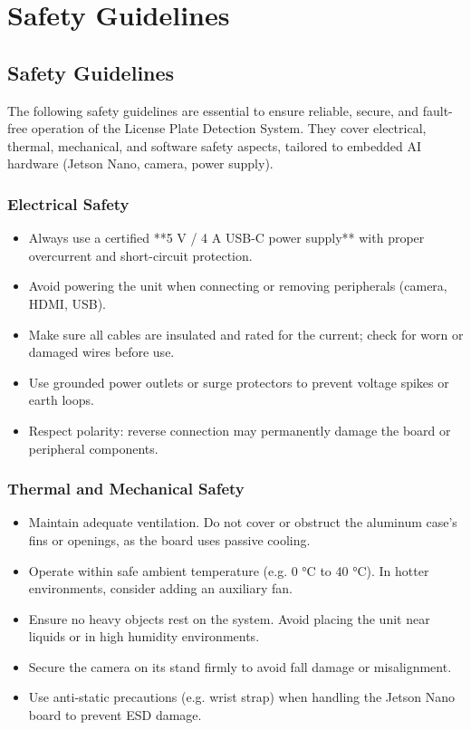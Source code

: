 %
%

\chapter{Safety Guidelines}

\section{Safety Guidelines}

The following safety guidelines are essential to ensure reliable, secure, and fault-free operation of the License Plate Detection System.  
They cover electrical, thermal, mechanical, and software safety aspects, tailored to embedded AI hardware (Jetson Nano, camera, power supply).

\subsection{Electrical Safety}

\begin{itemize}
	\item Always use a certified **5 V / 4 A USB-C power supply** with proper overcurrent and short-circuit protection.  
	\item Avoid powering the unit when connecting or removing peripherals (camera, HDMI, USB).  
	\item Make sure all cables are insulated and rated for the current; check for worn or damaged wires before use.  
	\item Use grounded power outlets or surge protectors to prevent voltage spikes or earth loops.  
	\item Respect polarity: reverse connection may permanently damage the board or peripheral components.
\end{itemize}

\subsection{Thermal and Mechanical Safety}

\begin{itemize}
	\item Maintain adequate ventilation. Do not cover or obstruct the aluminum case’s fins or openings, as the board uses passive cooling.  
	\item Operate within safe ambient temperature (e.g. 0 °C to 40 °C). In hotter environments, consider adding an auxiliary fan.  
	\item Ensure no heavy objects rest on the system. Avoid placing the unit near liquids or in high humidity environments.  
	\item Secure the camera on its stand firmly to avoid fall damage or misalignment.  
	\item Use anti-static precautions (e.g. wrist strap) when handling the Jetson Nano board to prevent ESD damage.
\end{itemize}


